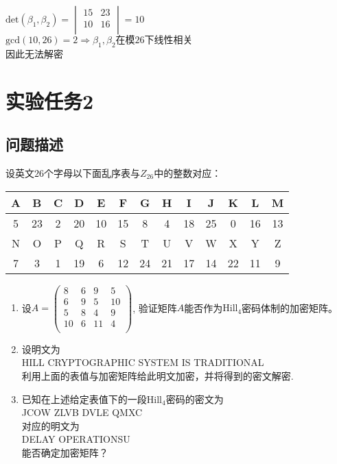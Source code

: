 \documentclass[12pt]{article}
\begin{document}
$\textrm{det}(\beta_1,\beta_2)=
\begin{vmatrix}
15 & 23\\
10 & 16\\
\end{vmatrix}=10
$\\
$\textrm{gcd}(10,26)=2 \Rightarrow \beta_1,\beta_2\text{在模26下线性相关}$\\
因此无法解密\\
\newpage
\section*{实验任务2}
\subsection*{问题描述}
设英文$26$个字母以下面乱序表与$Z_{26}$中的整数对应：

\begin{tabular}{|c|c|c|c|c|c|c|c|c|c|c|c|c|}
\hline
A & B & C & D & E & F & G & H & I & J & K & L & M \\
\hline
5 & 23 & 2 & 20 & 10 & 15 & 8 & 4 & 18 & 25 & 0 & 16 & 13 \\
\hline
N & O & P & Q & R & S & T & U & V & W & X & Y & Z \\
\hline
7 & 3 & 1 & 19 & 6 & 12 & 24 & 21 & 17 & 14 & 22 & 11 & 9 \\
\hline
\end{tabular}

\begin{enumerate}
\item
设$A=
\begin{pmatrix}
8 & 6 & 9 & 5\\
6 & 9 & 5 & 10\\
5 & 8 & 4 & 9\\
10 & 6 & 11 & 4\\
\end{pmatrix}
$, 验证矩阵$A$能否作为$\text{Hill}_4$密码体制的加密矩阵。
\item
设明文为\\
HILL CRYPTOGRAPHIC SYSTEM IS TRADITIONAL\\
利用上面的表值与加密矩阵给此明文加密，并将得到的密文解密.
\item
已知在上述给定表值下的一段$\text{Hill}_4$密码的密文为\\
JCOW ZLVB DVLE QMXC\\
对应的明文为\\
DELAY OPERATIONSU\\
能否确定加密矩阵？
\end{enumerate}
\end{document}
